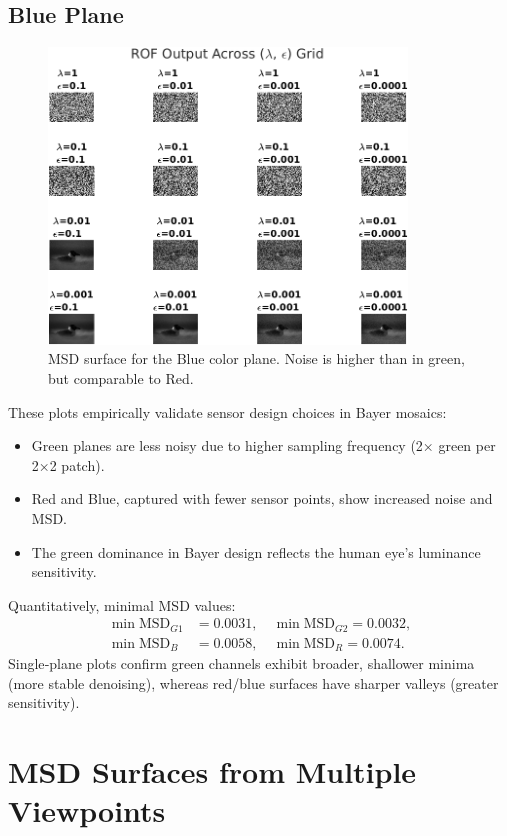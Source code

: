 \documentclass[11pt]{article}
\begin{document}
\subsection*{Blue Plane}
\begin{figure}[h!]
\centering
\includegraphics[width=0.85\textwidth]{../test/results/rof_grid_plane_B.png}
\caption{MSD surface for the Blue color plane. Noise is higher than in green, but comparable to Red.}
\end{figure}
\clearpage

\noindent These plots empirically validate sensor design choices in Bayer mosaics:
\begin{itemize}
  \item Green planes are less noisy due to higher sampling frequency (2× green per 2×2 patch).
  \item Red and Blue, captured with fewer sensor points, show increased noise and MSD.
  \item The green dominance in Bayer design reflects the human eye's luminance sensitivity.
\end{itemize}


Quantitatively, minimal MSD values:
\[
\begin{aligned}
\min\mathrm{MSD}_{G1}&=0.0031,\quad
\min\mathrm{MSD}_{G2}=0.0032,\\
\min\mathrm{MSD}_B&=0.0058,\quad
\min\mathrm{MSD}_R=0.0074.
\end{aligned}
\]
Single‐plane plots confirm green channels exhibit broader, shallower minima (more stable denoising), whereas red/blue surfaces have sharper valleys (greater sensitivity).

\section*{MSD Surfaces from Multiple Viewpoints}
\end{document}
